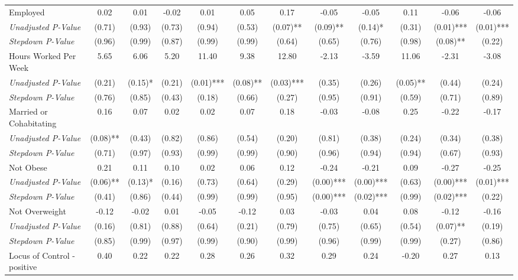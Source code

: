 \begin{tabular}{l c c c c c c c c c c c}
Employed & 0.02 & 0.01 & -0.02 & 0.01 & 0.05 & 0.17 & -0.05 & -0.05 & 0.11 & -0.06 & -0.06 \\
\quad \textit{Unadjusted P-Value} & (0.71) & (0.93) & (0.73) & (0.94) & (0.53) & (0.07)** & (0.09)** & (0.14)* & (0.31) & (0.01)*** & (0.01)*** \\
\quad \textit{Stepdown P-Value} & (0.96) & (0.99) & (0.87) & (0.99) & (0.99) & (0.64) & (0.65) & (0.76) & (0.98) & (0.08)** & (0.22) \\
Hours Worked Per Week & 5.65 & 6.06 & 5.20 & 11.40 & 9.38 & 12.80 & -2.13 & -3.59 & 11.06 & -2.31 & -3.08 \\
\quad \textit{Unadjusted P-Value} & (0.21) & (0.15)* & (0.21) & (0.01)*** & (0.08)** & (0.03)*** & (0.35) & (0.26) & (0.05)** & (0.44) & (0.24) \\
\quad \textit{Stepdown P-Value} & (0.76) & (0.85) & (0.43) & (0.18) & (0.66) & (0.27) & (0.95) & (0.91) & (0.59) & (0.71) & (0.89) \\
Married or Cohabitating & 0.16 & 0.07 & 0.02 & 0.02 & 0.07 & 0.18 & -0.03 & -0.08 & 0.25 & -0.22 & -0.17 \\
\quad \textit{Unadjusted P-Value} & (0.08)** & (0.43) & (0.82) & (0.86) & (0.54) & (0.20) & (0.81) & (0.38) & (0.24) & (0.34) & (0.38) \\
\quad \textit{Stepdown P-Value} & (0.71) & (0.97) & (0.93) & (0.99) & (0.99) & (0.90) & (0.96) & (0.94) & (0.94) & (0.67) & (0.93) \\
Not Obese & 0.21 & 0.11 & 0.10 & 0.02 & 0.06 & 0.12 & -0.24 & -0.21 & 0.09 & -0.27 & -0.25 \\
\quad \textit{Unadjusted P-Value} & (0.06)** & (0.13)* & (0.16) & (0.73) & (0.64) & (0.29) & (0.00)*** & (0.00)*** & (0.63) & (0.00)*** & (0.01)*** \\
\quad \textit{Stepdown P-Value} & (0.41) & (0.86) & (0.44) & (0.99) & (0.99) & (0.95) & (0.00)*** & (0.02)*** & (0.99) & (0.02)*** & (0.22) \\
Not Overweight & -0.12 & -0.02 & 0.01 & -0.05 & -0.12 & 0.03 & -0.03 & 0.04 & 0.08 & -0.12 & -0.16 \\
\quad \textit{Unadjusted P-Value} & (0.16) & (0.81) & (0.88) & (0.64) & (0.21) & (0.79) & (0.75) & (0.65) & (0.54) & (0.07)** & (0.19) \\
\quad \textit{Stepdown P-Value} & (0.85) & (0.99) & (0.97) & (0.99) & (0.90) & (0.99) & (0.96) & (0.99) & (0.99) & (0.27) & (0.86) \\
Locus of Control - positive & 0.40 & 0.22 & 0.22 & 0.28 & 0.26 & 0.32 & 0.29 & 0.24 & -0.20 & 0.27 & 0.13 \\

\end{tabular}
